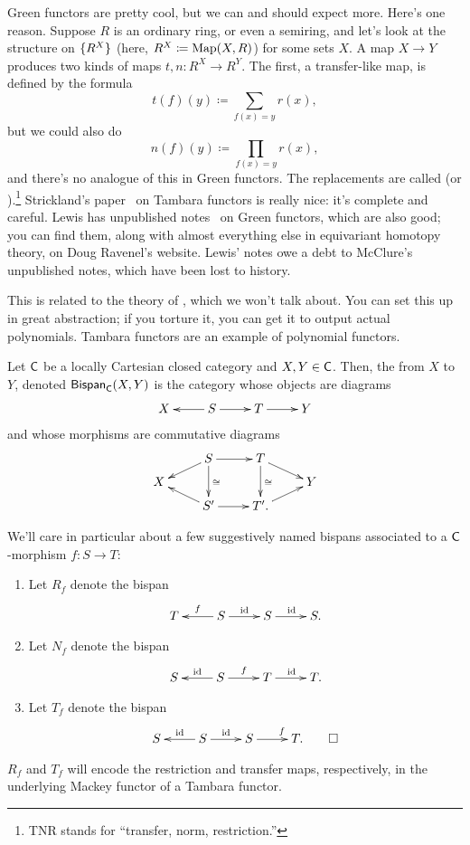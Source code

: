 Green functors are pretty cool, but we can and should expect more. Here's one reason. Suppose $R$ is an ordinary
ring, or even a semiring, and let's look at the structure on $\{R^X\}$ (here, $R^X\coloneqq \operatorname{Map}(X,R)$) for some
sets $X$. A map $X\to Y$ produces two kinds of maps $t, n\colon R^X\to R^Y$. The first, a transfer-like map, is
defined by the formula
\[t(f)(y)\coloneqq \sum_{f(x) = y} r(x),\]
but we could also do
\[n(f)(y)\coloneqq \prod_{f(x) = y} r(x),\]
and there's no analogue of this in Green functors. The replacements are called  (or
).\footnote{TNR stands for ``transfer, norm, restriction.''} Strickland's
paper~\cite{StricklandTambara} on Tambara functors is really nice: it's complete and careful. Lewis has unpublished
notes~\cite{LewisGreen} on Green functors, which are also good; you can find them, along with almost everything
else in equivariant homotopy theory, on Doug Ravenel's website. Lewis' notes owe a debt to McClure's unpublished
notes, which have been lost to history.
\begin{rem}
This is related to the theory of , which we won't talk about. You can set this up in
great abstraction; if you torture it, you can get it to output actual polynomials. Tambara functors are an example
of polynomial functors.
\end{rem}
\begin{defn}
Let $\mathsf C$ be a locally Cartesian closed category and $X,Y\in\mathsf C$. Then, the  from $X$ to
$Y$, denoted $\mathsf{Bispan}_\mathsf C(X,Y)$ is the category whose objects are diagrams
\begin{equation}
\label{span1}
\xymatrix{
	X & S\ar[l]\ar[r] & T\ar[r] & Y
}
\end{equation}
and whose morphisms are commutative diagrams
\[\xymatrix@R=0.2cm{
	& S\ar[r]\ar[dl]\ar[dd]^\cong & T\ar[dd]^\cong\ar[dr]\\
	X &&& Y\\
	& S'\ar[r]\ar[ul] & T'.\ar[ur]
}\]
\end{defn}
\begin{exm}
\label{suggest_name}
We'll care in particular about a few suggestively named bispans associated to a $\mathsf C$-morphism $f\colon S\to T$:
\begin{enumerate}
	\item Let $R_f$ denote the bispan
	\[\xymatrix{
		T & S\ar[l]_f\ar[r]^\id & S\ar[r]^\id & S.
	}\]
	\item Let $N_f$ denote the bispan
	\[\xymatrix{
		S & S\ar[l]_\id\ar[r]^f & T\ar[r]^\id & T.
	}\]
	\item Let $T_f$ denote the bispan
	\[\xymatrix{
		S & S\ar[l]_\id\ar[r]^\id & S\ar[r]^f & T.\qedhere
	}\]
\end{enumerate}
\end{exm}
$R_f$ and $T_f$ will encode the restriction and transfer maps, respectively, in the underlying Mackey functor of a
Tambara functor.

